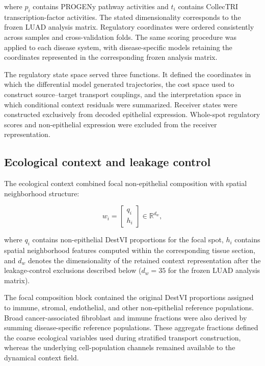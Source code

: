 where \(p_i\) contains PROGENy pathway activities and \(t_i\) contains CollecTRI transcription-factor activities. The stated dimensionality corresponds to the frozen LUAD analysis matrix. Regulatory coordinates were
ordered consistently across samples and cross-validation folds. The same
scoring procedure was applied to each disease system, with disease-specific models retaining the coordinates represented in the corresponding frozen
analysis matrix.

The regulatory state space served three functions. It defined the coordinates in which the differential model generated trajectories, the cost space used to
construct source--target transport couplings, and the interpretation space in which conditional context residuals were summarized. Receiver states were constructed exclusively from decoded epithelial expression. Whole-spot regulatory scores and non-epithelial expression were excluded from the receiver representation.

\subsection{Ecological context and leakage control}
\label{sec:methods-context-construction}
\label{sec:methods-context-audit}

The ecological context combined focal non-epithelial composition with spatial
neighborhood structure:

\begin{equation}
w_i
=
\begin{bmatrix}
q_i \\
h_i
\end{bmatrix}
\in
\mathbb{R}^{d_w},
\label{eq:methods-context-vector}
\end{equation}

where \(q_i\) contains non-epithelial DestVI proportions for the focal spot,
\(h_i\) contains spatial neighborhood features computed within the corresponding
tissue section, and \(d_w\) denotes the dimensionality of the retained context
representation after the leakage-control exclusions described below
(\(d_w=35\) for the frozen LUAD analysis matrix).

The focal composition block contained the original DestVI proportions assigned to immune, stromal, endothelial, and other non-epithelial reference populations. Broad cancer-associated fibroblast and immune fractions were also
derived by summing disease-specific reference populations. These aggregate fractions defined the coarse ecological variables used during stratified transport construction, whereas the underlying cell-population channels
remained available to the dynamical context field.

